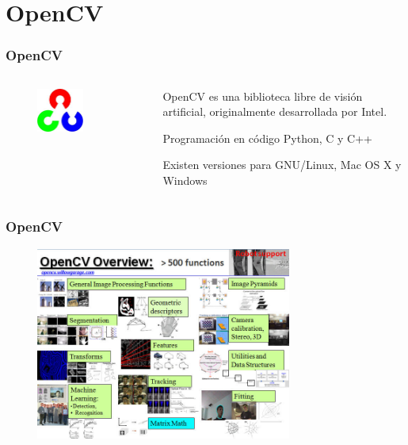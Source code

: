 \section{OpenCV}

\begin{frame}\frametitle{OpenCV}
  \begin{columns}
    \begin{column}{0.5\textwidth}
      \begin{figure}
        \centering
        \includegraphics[width=0.6\textwidth]{Figures/OpenCVLogo.png}
      \end{figure}
    \end{column}
    \begin{column}{0.5\textwidth}
      OpenCV es una biblioteca libre de visión artificial, originalmente desarrollada por Intel.
      
      Programación en código  Python, C y C++
      
      Existen versiones para GNU/Linux, Mac OS X y Windows
    \end{column}
    \end{columns}
    \end{frame}

\begin{frame}\frametitle{OpenCV}
\begin{figure}[h!]
        \centering
        \includegraphics[width=0.75\textwidth]{Figures/OpenCVOverview.png}
\end{figure}
\end{frame}

